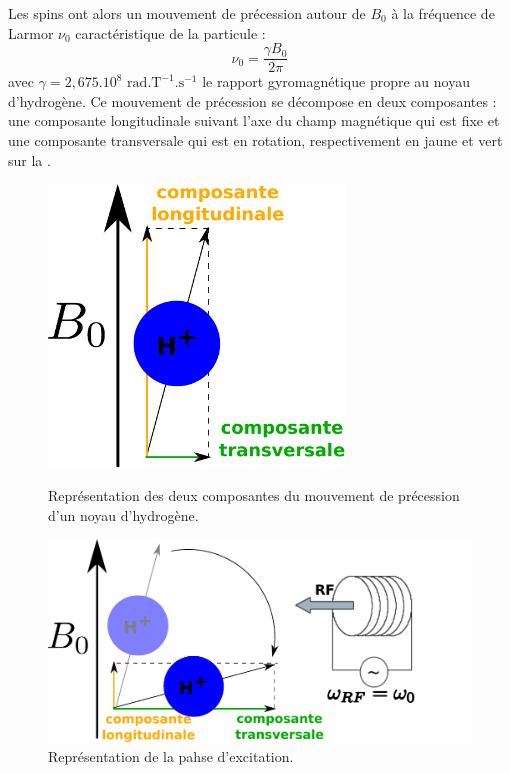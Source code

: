 Les spins ont alors un mouvement de précession autour de $B_0$ à la fréquence de Larmor $\nu_0$ caractéristique de la particule :
\begin{equation}
    \nu_0 = \frac{\gamma B_0}{2\pi}
\end{equation}
\noindent avec $\gamma=2,675.10^8 \text{ rad}.\text{T}^{-1}.\text{s}^{-1}$ le rapport gyromagnétique propre au noyau d'hydrogène.
Ce mouvement de précession se décompose en deux composantes :
une composante longitudinale suivant l'axe du champ magnétique qui est fixe et une composante transversale qui est en rotation, 
respectivement en jaune et vert sur la .

\begin{figure}[ht]
    \begin{minipage}[c]{0.45\textwidth}
	    \centering
	    \includegraphics[width=0.7\textwidth]{Images/spin_composantes.pdf}
	    \caption{\label{fig:spin_composantes}Représentation des deux composantes du mouvement de précession d'un noyau d'hydrogène.}
    \end{minipage}\hfill
    \begin{minipage}[c]{0.45\textwidth}
	    \centering
	    \includegraphics[width=1\textwidth]{Images/excitation.pdf}
	    \caption{\label{fig:excitation}Représentation de la pahse d'excitation.}
    \end{minipage}
\end{figure}

